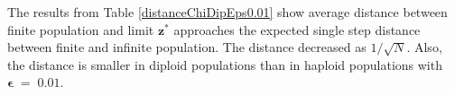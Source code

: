 The results from Table \ref{distanceChiDipEps0.01} show average distance 
between finite population and limit $\bm{z^\ast}$ approaches the expected single step distance 
between finite and infinite population. The distance decreased as $1/\sqrt{N}$. 
Also, the distance is smaller in diploid populations than in haploid populations with $\bm{\epsilon} \;=\; 0.01$.


